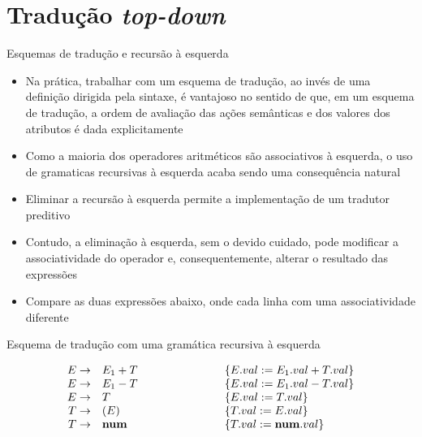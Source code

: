 \section{Tradução {\it top-down}}

\begin{frame}[fragile]{Esquemas de tradução e recursão à esquerda}

    \begin{itemize}
        \item Na prática, trabalhar com um esquema de tradução, ao invés de uma definição dirigida pela sintaxe, é vantajoso no sentido de que, em um esquema
            de tradução, a ordem de avaliação das ações semânticas e dos valores dos atributos é dada explicitamente
        \pause

        \item Como a maioria dos operadores aritméticos são associativos à esquerda, o uso de gramaticas recursivas à esquerda acaba sendo uma consequência
            natural
        \pause

        \item Eliminar a recursão à esquerda permite a implementação de um tradutor preditivo
        \pause

        \item Contudo, a eliminação à esquerda, sem o devido cuidado, pode modificar a associatividade do operador e, consequentemente, alterar o resultado das 
        expressões
        \pause

        \item Compare as duas expressões abaixo, onde cada linha com uma associatividade diferente
    \end{itemize}

\end{frame}

\begin{frame}[fragile]{Esquema de tradução com uma gramática recursiva à esquerda}

\[
    \begin{array}{rlp{2cm}l}
        E \to& E_1 + T & & \{E.val := E_1.val + T.val\} \\
        E \to& E_1 - T & & \{E.val := E_1.val - T.val\} \\
        E \to& T & & \{E.val := T.val\} \\
        T \to& (E) & & \{T.val := E.val\} \\
        T \to& \textbf{num} & & \{T.val := \textbf{num}.val\}
    \end{array}
\]

\end{frame}


